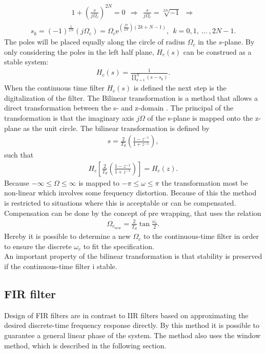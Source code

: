 \begin{align}
1+\left( \frac{s}{j\Omega_c}\right)^{2N} = 0 \ \  \Rightarrow  \ \ \frac{s}{j \Omega_c} = \sqrt[2N]{-1} \ \
\Rightarrow 
\end{align}
\begin{align}
s_k = (-1)^{\frac{1}{2N}}\left(j\Omega_c\right)=\Omega_c\text{e}^{\left(\frac{j\pi}{2N}\right)\left(2k+N-1\right)}, \ \ k=0,1,\ ... \ , 2N-1.
\end{align}   
The poles will be placed equally along the circle of radius $\Omega_c$ in the $s$-plane. By only considering the poles in the left half plane, $H_c(s)$ can be construed as a stable system:
\begin{align}
H_c(s)=\frac{1}{\prod_{k=1}^{N}(s-s_k)}.
\end{align}    
When the continuous time filter $H_c(s)$ is defined the next step is the digitalization of the filter.  The Bilinear transformation is a method that allows a direct transformation between the s- and z-domain . The principal of the transformation is that the imaginary axis $j\Omega$ of the s-plane is mapped onto the z-plane as the unit circle. The bilinear transformation is defined by 
\begin{align}
s=\frac{2}{T_d}\left(\frac{1-z^{-1}}{1+z^{-1}}\right), 
\end{align}
such that 
\begin{align}
H_c\left[\frac{2}{T_d}\left(\frac{1-z^{-1}}{1+z^{-1}}\right)\right]=H_c(z). 
\end{align}  
Because $-\infty \leq \Omega \leq \infty $ is mapped to $-\pi \leq \omega \leq \pi$ the transformation most be non-linear which involves some frequency distortion. Because of this the method is restricted to situations where this is acceptable or can be compensated. Compensation can be done by the concept of pre wrapping, that uses the relation 
\begin{align}
\Omega_{c_{new}}=\frac{2}{T_d}\tan\frac{\omega_c}{2}.
\end{align}
Hereby it is possible to determine a new $\Omega_c$ to the continuous-time filter in order to ensure the discrete $\omega_c$ to fit the specification.\\
An important property of the bilinear transformation is that stability is preserved if the continuous-time filter i stable.
\subsection{FIR filter}\label{subsec:FIR}
Design of FIR filters are in contrast to IIR filters based on approximating the desired discrete-time frequency response directly. By this method it is possible to guarantee a general linear phase of the system. The method also uses the window method, which is described in the following section.
